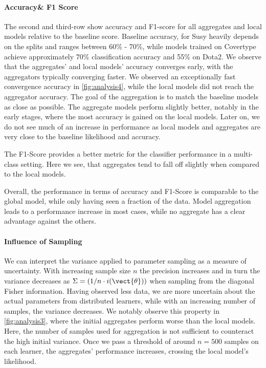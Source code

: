 \paragraph*{Accuracy\& F1 Score}
The second and third-row show accuracy and F1-score for all aggregates and local models relative to the baseline score.
Baseline accuracy, for Susy heavily depends on the splits and ranges between 60\% - 70\%, while models trained on Covertype achieve approximately 70\% classification accuracy and 55\% on Dota2.
We observe that the aggregates' and local models' accuracy converges early, with the aggregators typically converging faster.
We observed an exceptionally fast convergence \wrt accuracy in \autoref{fig:analysis4}, while the local models did not reach the aggregator accuracy.
The goal of the aggregation is to match the baseline models as close as possible.
The aggregate models perform slightly better, notably in the early stages, where the most accuracy is gained on the local models. 
Later on, we do not see much of an increase in performance as local models and aggregates are very close to the baseline likelihood and accuracy.

The F1-Score provides a better metric for the classifier performance in a multi-class setting. 
Here we see, that aggregates tend to fall off slightly when compared to the local models.

Overall, the performance in terms of accuracy and F1-Score is comparable to the global model, while only having seen a fraction of the data.
Model aggregation leads to a performance increase in most cases, while no aggregate has a clear advantage against the others.

\paragraph*{Influence of Sampling}
We can interpret the variance applied to parameter sampling as a measure of uncertainty. 
With increasing sample size $n$ the precision increases and in turn the variance decreases as $\Sigma = (1/n\cdot i(\vect{\theta}))$ when sampling from the diagonal Fisher information.
Having observed less data, we are more uncertain about the actual parameters from distributed learners, while with an increasing number of samples, the variance decreases.
We notably observe this property in \autoref{fig:analysis3}, where the initial aggregates perform worse than the local models.
Here, the number of samples used for aggregation is not sufficient to counteract the high initial variance.
Once we pass a threshold of around $n=500$  samples on each learner, the aggregates' performance increases, crossing the local model's likelihood.

